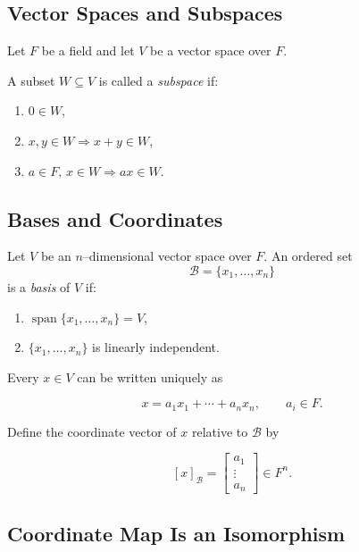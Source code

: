 \documentclass[12pt]{article}
\theoremstyle{remark}
\theoremstyle{definition}
\begin{document}
\subsection*{Vector Spaces and Subspaces}

Let $F$ be a field and let $V$ be a vector space over $F$.

A subset $W \subseteq V$ is called a \emph{subspace} if:
\begin{enumerate}
    \item $0 \in W$,
    \item $x,y \in W \Rightarrow x+y \in W$,
    \item $a \in F,\, x \in W \Rightarrow ax \in W$.
\end{enumerate}

\begin{center}
\end{center}

\subsection*{Bases and Coordinates}

Let $V$ be an $n$--dimensional vector space over $F$.
An ordered set
\[
\mathcal{B} = \{x_1,\dots,x_n\}
\]
is a \emph{basis} of $V$ if:
\begin{enumerate}
    \item $\operatorname{span}\{x_1,\dots,x_n\} = V$,
    \item $\{x_1,\dots,x_n\}$ is linearly independent.
\end{enumerate}

Every $x \in V$ can be written uniquely as

\[
x = a_1 x_1 + \cdots + a_n x_n,
\qquad a_i \in F.
\]

Define the coordinate vector of $x$ relative to $\mathcal{B}$ by

\[
[x]_{\mathcal{B}} =
\begin{bmatrix}
a_1 \\ \vdots \\ a_n
\end{bmatrix}
\in F^n.
\]

\subsection*{Coordinate Map Is an Isomorphism}
\end{document}
